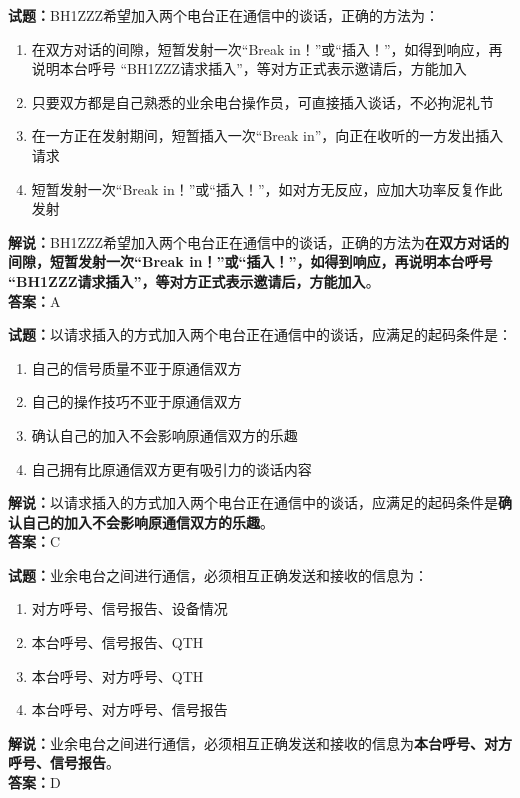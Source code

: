 \documentclass{ctexbook}
\begin{document}
\bigskip


\noindent\textbf{试题：}BH1ZZZ希望加入两个电台正在通信中的谈话，正确的方法为：
\begin{enumerate}[leftmargin=3em]
	\item 在双方对话的间隙，短暂发射一次“Break in！”或“插入！”，如得到响应，再说明本台呼号 “BH1ZZZ请求插入”，等对方正式表示邀请后，方能加入
	\item 只要双方都是自己熟悉的业余电台操作员，可直接插入谈话，不必拘泥礼节
	\item 在一方正在发射期间，短暂插入一次“Break in”，向正在收听的一方发出插入请求
	\item 短暂发射一次“Break in！”或“插入！”，如对方无反应，应加大功率反复作此发射
\end{enumerate}
\noindent\textbf{解说：}BH1ZZZ希望加入两个电台正在通信中的谈话，正确的方法为\textbf{在双方对话的间隙，短暂发射一次“Break in！”或“插入！”，如得到响应，再说明本台呼号 “BH1ZZZ请求插入”，等对方正式表示邀请后，方能加入}。\\\noindent\textbf{答案：}A


\bigskip


\noindent\textbf{试题：}以请求插入的方式加入两个电台正在通信中的谈话，应满足的起码条件是：
\begin{enumerate}[leftmargin=3em]
	\item 自己的信号质量不亚于原通信双方
	\item 自己的操作技巧不亚于原通信双方
	\item 确认自己的加入不会影响原通信双方的乐趣
	\item 自己拥有比原通信双方更有吸引力的谈话内容
\end{enumerate}
\noindent\textbf{解说：}以请求插入的方式加入两个电台正在通信中的谈话，应满足的起码条件是\textbf{确认自己的加入不会影响原通信双方的乐趣}。\\\noindent\textbf{答案：}C


\bigskip


\noindent\textbf{试题：}业余电台之间进行通信，必须相互正确发送和接收的信息为：
\begin{enumerate}[leftmargin=3em]
	\item 对方呼号、信号报告、设备情况
	\item 本台呼号、信号报告、QTH
	\item 本台呼号、对方呼号、QTH
	\item 本台呼号、对方呼号、信号报告
\end{enumerate}
\noindent\textbf{解说：}业余电台之间进行通信，必须相互正确发送和接收的信息为\textbf{本台呼号、对方呼号、信号报告}。\\\noindent\textbf{答案：}D
\end{document}
